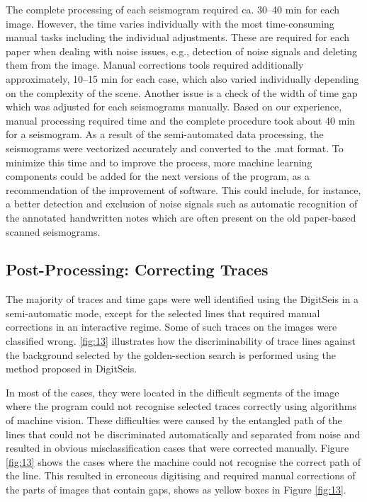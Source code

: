 \documentclass[sensors,article,accept,moreauthors,pdftex]{Definitions/mdpi}
\begin{document}
{The complete processing of each seismogram required ca. 30--40 min for each image. However, the time varies individually with the most time-consuming manual tasks including the individual adjustments. These are required for each paper when dealing with noise issues, e.g., detection of noise signals and deleting them from the image. \linebreak Manual corrections tools required additionally approximately, 10--15 min for each case, which also varied individually depending on the complexity of the scene. Another issue is a check of the width of time gap which was adjusted for each seismograms manually. Based on our experience, manual processing required time and the complete procedure took about 40 min for a seismogram. As a result of the semi-automated data processing, the seismograms were vectorized accurately and converted to the .mat format. To minimize this time and to improve the process, more machine learning components could be added for the next versions of the program, as a recommendation of the improvement of software. This could include, for instance, a better detection and exclusion of noise signals such as automatic recognition of the annotated handwritten notes which are often present on the old paper-based scanned seismograms.}

\subsection{Post-Processing: Correcting Traces}

The majority of traces and time gaps were well identified {using the }DigitSeis {in a semi-automatic mode}, except for {the }selected lines that required manual corrections in an interactive regime. Some of such traces on the images were classified wrong. \ref{fig:13} {illustrates how the discriminability of trace lines against the background selected by the golden-section search is performed using the method proposed in DigitSeis.}

{In most of the cases,} they were located in the difficult segments of the image where the program could not recognise selected traces correctly using algorithms of machine vision. These difficulties were caused by the entangled path of{ the }lines that could not be discriminated automatically {and separated }from noise {and resulted in obvious misclassification cases that were corrected manually. Figure } \ref{fig:13} {shows the cases }where the machine could {not }recognise the correct path of the line. This resulted in erroneous digitising and required manual corrections of the parts of images that contain gaps{, shows as }yellow boxes{ in }Figure \ref{fig:13}. 
\end{document}
